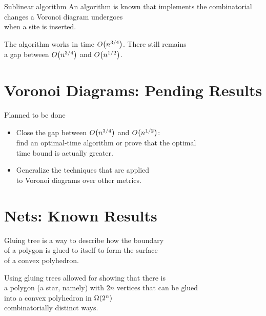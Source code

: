 \documentclass[12pt,aspectratio=169,svgnames]{beamer}
\begin{document}
\begin{frame}{Sublinear algorithm}
	An algorithm is known that implements the combinatorial \\
	changes a Voronoi diagram undergoes \\
	when a site is inserted. \bigskip

	The algorithm works in time \(O\lr*{n^{3/4}}\). There still remains \\
	a gap between \(O\lr*{n^{3/4}}\) and \(O\lr*{n^{1/2}}\).
\end{frame}

\section{Voronoi Diagrams: Pending Results}

\begin{frame}{Planned to be done}
\begin{itemize}
	\item Close the gap between \(O\lr*{n^{3/4}}\) and \(O\lr*{n^{1/2}}\): \\
		find an optimal-time algorithm or prove that the optimal \\
		time bound is actually greater. \bigskip
	\item Generalize the techniques that are applied \\
		to Voronoi diagrams over other metrics.
\end{itemize}
\end{frame}

\section{Nets: Known Results}

\begin{frame}{Gluing tree}
	\vphantom{x}{\it The gluing tree} is a way to describe how the boundary \\
	of a polygon is glued to itself to form the surface \\
	of a convex polyhedron. \bigskip

	Using gluing trees allowed for showing that there is \\
	a polygon (a star, namely) with \(2n\) vertices that can be glued \\
	into a convex polyhedron in \(\Omega\lr*{2^n}\) \\
	combinatorially distinct ways.
\end{frame}
\end{document}
